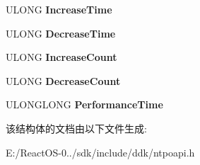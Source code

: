 \begin{DoxyCompactItemize}
U\+L\+O\+NG {\bfseries Increase\+Time}
\item 
\mbox{\label{struct___p_r_o_c_e_s_s_o_r___p_e_r_f___s_t_a_t_e_a63779ff8967e65d8a83683b368af46cd}} 
U\+L\+O\+NG {\bfseries Decrease\+Time}
\item 
\mbox{\label{struct___p_r_o_c_e_s_s_o_r___p_e_r_f___s_t_a_t_e_a5312fc507f4995fa8f009fd17a93f2f8}} 
U\+L\+O\+NG {\bfseries Increase\+Count}
\item 
\mbox{\label{struct___p_r_o_c_e_s_s_o_r___p_e_r_f___s_t_a_t_e_ae99ef308374a5fbade3ff0602bb04519}} 
U\+L\+O\+NG {\bfseries Decrease\+Count}
\item 
\mbox{\label{struct___p_r_o_c_e_s_s_o_r___p_e_r_f___s_t_a_t_e_acdf82f1ff8425299d110778a38f2f87f}} 
U\+L\+O\+N\+G\+L\+O\+NG {\bfseries Performance\+Time}
\end{DoxyCompactItemize}


该结构体的文档由以下文件生成\+:\begin{DoxyCompactItemize}
\item 
E\+:/\+React\+O\+S-\/0../sdk/include/ddk/ntpoapi.\+h\end{DoxyCompactItemize}
